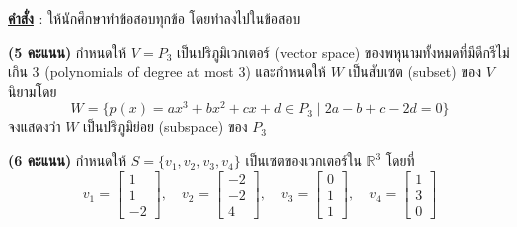 \documentclass[12pt, a4paper]{exam}
\begin{document}
\setcounter{page}{2}

\noindent \textbf{\underline{คำสั่ง}} : ให้นักศึกษาทำข้อสอบทุกข้อ โดยทำลงไปในข้อสอบ
\vspace{0.5cm}

\begin{questions}

\question \textbf{(5 คะแนน)} กำหนดให้ $V = P_3$ เป็นปริภูมิเวกเตอร์ (vector space) ของพหุนามทั้งหมดที่มีดีกรีไม่เกิน 3 (polynomials of degree at most 3) และกำหนดให้ $W$ เป็นสับเซต (subset) ของ $V$ นิยามโดย
\[
W = \{p(x) = ax^3 + bx^2 + cx + d \in P_3 \mid 2a - b + c - 2d = 0\}
\]
จงแสดงว่า $W$ เป็นปริภูมิย่อย (subspace) ของ $P_3$
\newpage

\question \textbf{(6 คะแนน)} กำหนดให้ $S = \{v_1, v_2, v_3, v_4\}$ เป็นเซตของเวกเตอร์ใน $\mathbb{R}^3$ โดยที่
\[
v_1 = \begin{bmatrix} 1 \\ 1 \\ -2 \end{bmatrix}, \quad
v_2 = \begin{bmatrix} -2 \\ -2 \\ 4 \end{bmatrix}, \quad
v_3 = \begin{bmatrix} 0 \\ 1 \\ 1 \end{bmatrix}, \quad
v_4 = \begin{bmatrix} 1 \\ 3 \\ 0 \end{bmatrix}
\]
\newpage


\end{questions}
\end{document}
